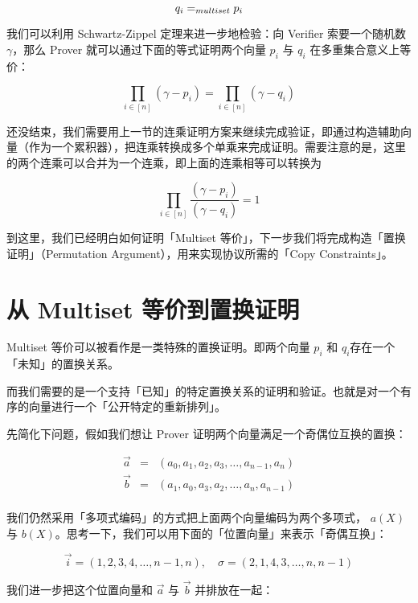 \[
\\{q_i\\}=_{multiset}\\{p_i\\}
\]

我们可以利用 Schwartz-Zippel 定理来进一步地检验：向 Verifier
索要一个随机数 \(\gamma\)，那么 Prover 就可以通过下面的等式证明两个向量
\({p_i}\) 与 \({q_i}\) 在多重集合意义上等价：

\[
\prod_{{i\in[n]}}(\gamma-p_i)=\prod_{i\in[n]}(\gamma-q_i)
\]

还没结束，我们需要用上一节的连乘证明方案来继续完成验证，即通过构造辅助向量（作为一个累积器），把连乘转换成多个单乘来完成证明。需要注意的是，这里的两个连乘可以合并为一个连乘，即上面的连乘相等可以转换为

\[
\prod_{{i\in[n]}}\frac{(\gamma-p_i)}{(\gamma-q_i)}=1
\]

到这里，我们已经明白如何证明「Multiset
等价」，下一步我们将完成构造「置换证明」（Permutation
Argument），用来实现协议所需的「Copy Constraints」。

\hypertarget{ux4ece-multiset-ux7b49ux4ef7ux5230ux7f6eux6362ux8bc1ux660e}{%
\section{从 Multiset
等价到置换证明}\label{ux4ece-multiset-ux7b49ux4ef7ux5230ux7f6eux6362ux8bc1ux660e}}

Multiset 等价可以被看作是一类特殊的置换证明。即两个向量 \({p_i}\) 和
\({q_i}\)存在一个「未知」的置换关系。

而我们需要的是一个支持「已知」的特定置换关系的证明和验证。也就是对一个有序的向量进行一个「公开特定的重新排列」。

先简化下问题，假如我们想让 Prover 证明两个向量满足一个奇偶位互换的置换：

\[
\begin{array}{rcl}
\vec{a} &=& (a_0, a_1, a_2, a_3,\ldots, a_{n-1}, a_n) \\
\vec{b} &=& (a_1, a_0, a_3, a_2, \ldots, a_n, a_{n-1})\\
\end{array}
\]

我们仍然采用「多项式编码」的方式把上面两个向量编码为两个多项式，
\(a(X)\) 与
\(b(X)\)。思考一下，我们可以用下面的「位置向量」来表示「奇偶互换」：

\[
\vec{i}=(1,2,3,4,\ldots, n-1, n),\quad \sigma = (2, 1, 4, 3,\ldots, n, n-1)
\]

我们进一步把这个位置向量和 \(\vec{a}\) 与 \(\vec{b}\) 并排放在一起：

